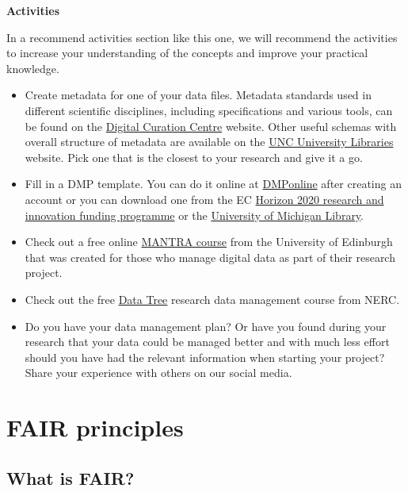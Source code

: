 \documentclass[
]{book}
\begin{document}
\textbf{Activities}

In a recommend activities section like this one, we will recommend the activities to increase your understanding of the concepts and improve your practical knowledge.

\begin{itemize}
\item
  Create metadata for one of your data files. Metadata standards used in different scientific disciplines, including specifications and various tools, can be found on the \href{https://www.dcc.ac.uk/guidance/standards/metadata}{Digital Curation Centre} website. Other useful schemas with overall structure of metadata are available on the \href{https://guides.lib.unc.edu/metadata/standards}{UNC University Libraries} website. Pick one that is the closest to your research and give it a go.
\item
  Fill in a DMP template. You can do it online at \href{https://dmponline.dcc.ac.uk/}{DMPonline} after creating an account or you can download one from the EC \href{https://ec.europa.eu/research/participants/data/ref/h2020/gm/reporting/h2020-tpl-oa-data-mgt-plan_en.docx}{Horizon 2020 research and innovation funding programme} or the \href{https://guides.lib.umich.edu/c.php?g=283277\&p=2138498}{University of Michigan Library}.
\item
  Check out a free online \href{https://mantra.ed.ac.uk/}{MANTRA course} from the University of Edinburgh that was created for those who manage digital data as part of their research project.
\item
  Check out the free \href{https://datatree.org.uk/}{Data Tree} research data management course from NERC.
\item
  Do you have your data management plan? Or have you found during your research that your data could be managed better and with much less effort should you have had the relevant information when starting your project? Share your experience with others on our social media.
\end{itemize}

\hypertarget{fair-principles}{%
\chapter{FAIR principles}\label{fair-principles}}

\hypertarget{what-is-fair}{%
\section{What is FAIR?}\label{what-is-fair}}
\end{document}
